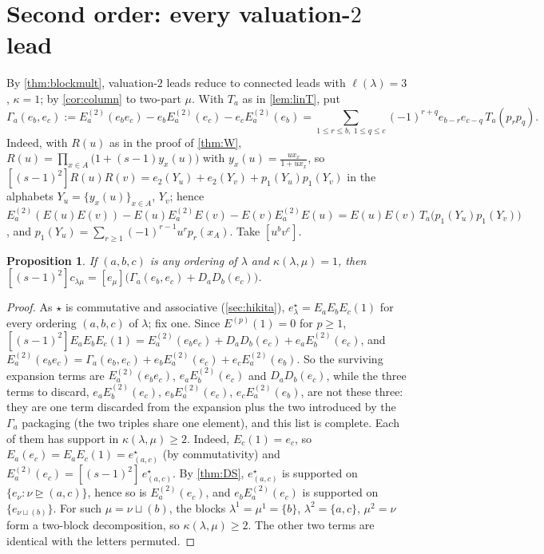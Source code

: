 \documentclass[11pt]{amsart}
\newtheorem{proposition}[theorem]{Proposition}
\theoremstyle{definition}
\theoremstyle{remark}
\numberwithin{equation}{section}
\begin{document}
\section{Second order: every valuation-$2$ lead}\label{sec:v2}

By \cref{thm:blockmult}, valuation-$2$ leads reduce to connected leads with $\ell(\lambda)=3$, $\kappa=1$; by \cref{cor:column} to two-part $\mu$. With $T_a$ as in \cref{lem:linT}, put
\[ \Gamma_a(e_b,e_c):=E_a^{(2)}(e_be_c)-e_bE_a^{(2)}(e_c)-e_cE_a^{(2)}(e_b)=\sum_{1\le r\le b,\ 1\le q\le c}(-1)^{r+q}e_{b-r}e_{c-q}\,T_a(p_rp_q). \]
Indeed, with $R(u)$ as in the proof of \cref{thm:W}, $R(u)=\prod_{x\in A}\bigl(1+(s-1)y_x(u)\bigr)$ with $y_x(u)=\frac{ux_x}{1+ux_x}$, so $[(s-1)^2]R(u)R(v)=e_2(Y_u)+e_2(Y_v)+p_1(Y_u)p_1(Y_v)$ in the alphabets $Y_u=\{y_x(u)\}_{x\in A}$, $Y_v$; hence $E_a^{(2)}(E(u)E(v))-E(u)E_a^{(2)}E(v)-E(v)E_a^{(2)}E(u)=E(u)E(v)\,T_a\bigl(p_1(Y_u)p_1(Y_v)\bigr)$, and $p_1(Y_u)=\sum_{r\ge1}(-1)^{r-1}u^rp_r(x_A)$. Take $[u^bv^c]$.

\begin{proposition}\label{prop:reduce}
If $(a,b,c)$ is any ordering of $\lambda$ and $\kappa(\lambda,\mu)=1$, then $[(s-1)^2]c_{\lambda\mu}=[e_\mu]\bigl(\Gamma_a(e_b,e_c)+D_aD_b(e_c)\bigr)$.
\end{proposition}
\begin{proof}
As $\star$ is commutative and associative (\cref{sec:hikita}), $e^\star_\lambda=E_aE_bE_c(1)$ for every ordering $(a,b,c)$ of $\lambda$; fix one. Since $E^{(p)}(1)=0$ for $p\ge1$, $[(s-1)^2]E_aE_bE_c(1)=E_a^{(2)}(e_be_c)+D_aD_b(e_c)+e_aE_b^{(2)}(e_c)$, and $E_a^{(2)}(e_be_c)=\Gamma_a(e_b,e_c)+e_bE_a^{(2)}(e_c)+e_cE_a^{(2)}(e_b)$. So the surviving expansion terms are $E_a^{(2)}(e_be_c)$, $e_aE_b^{(2)}(e_c)$ and $D_aD_b(e_c)$, while the three terms to discard, $e_aE_b^{(2)}(e_c)$, $e_bE_a^{(2)}(e_c)$, $e_cE_a^{(2)}(e_b)$, are not these three: they are one term discarded from the expansion plus the two introduced by the $\Gamma_a$ packaging (the two triples share one element), and this list is complete. Each of them has support in $\kappa(\lambda,\mu)\ge2$. Indeed, $E_c(1)=e_c$, so $E_a(e_c)=E_aE_c(1)=e^\star_{(a,c)}$ (by commutativity) and $E_a^{(2)}(e_c)=[(s-1)^2]\,e^\star_{(a,c)}$. By \cref{thm:DS}, $e^\star_{(a,c)}$ is supported on $\{e_\nu:\nu\trianglerighteq(a,c)\}$, hence so is $E_a^{(2)}(e_c)$, and $e_bE_a^{(2)}(e_c)$ is supported on $\{e_{\nu\sqcup(b)}\}$. For such $\mu=\nu\sqcup(b)$, the blocks $\lambda^1=\mu^1=\{b\}$, $\lambda^2=\{a,c\}$, $\mu^2=\nu$ form a two-block decomposition, so $\kappa(\lambda,\mu)\ge2$. The other two terms are identical with the letters permuted.
\end{proof}
\end{document}
